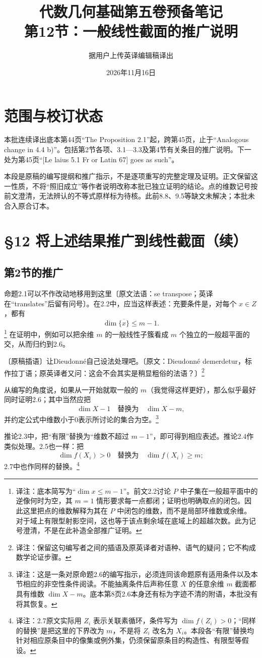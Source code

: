 \documentclass[openany,fontset=fandol]{ctexbook}
\title{代数几何基础第五卷预备笔记\\第12节：一般线性截面的推广说明}
\author{据用户上传英译编辑稿译出}
\date{2026年11月16日}
\newcommand{\note}[1]{\footnote{译注：#1}}
\begin{document}
\maketitle
\chapter*{范围与校订状态}
本批连续译出底本第44页“The Proposition 2.1”起，跨第45页，止于“Analogous change in 4.4 b)”。包括第2节各项、3.1—3.3及第4节有关条目的推广说明。下一处为第45页“[Le laius 5.1 Fr or Latin 67] goes as such”。

本段是原稿的编写提纲和推广指示，不是逐项重写的完整定理及证明。正文保留这一性质，不将“照旧成立”等作者说明改称本批已独立证明的结论。点的维数记号按前文澄清，无法辨认的不等式原样标为待核。此前8.8、9.5等缺文未解决；本批未合入原合订本。
\chapter*{\S12 将上述结果推广到线性截面（续）}
\section*{第2节的推广}
命题2.1可以不作改动地移用到这里〔原文法语：se transpose；英译在“translates”后留有问号〕。在2.2中，应当这样表述：充要条件是，对每个 $x\in Z$，都有
\[
\dim\overline{\{x\}}\leq m-1.
\]
\note{底本简写为“$\dim x\leq m-1$”。前文2.2讨论 $P$ 中子集在一般超平面中的逆像何时为空，其 $m=1$ 情形要求每一点都闭；证明也明确取点的闭包。因此这里把点的维数解释为其在 $P$ 中闭包的维数，而不是局部环维数或余维。对于域上有限型射影空间，这也等于该点剩余域在底域上的超越次数。此为记号澄清，不是在此补造全部推广证明。}
在证明中，例如可以把余维 $m$ 的一般线性子簇看成 $m$ 个独立的一般超平面的交，从而归约到2.6。

〔原稿插语〕让Dieudonné自己设法处理吧。〔原文：Dieudonné demerdetur，标作拉丁语；原英译者又问：这会不会其实是稍显粗俗的法语？〕\note{保留这句编写者之间的插语及原英译者对语种、语气的疑问；它不构成数学论证步骤。}

从编写的角度说，如果从一开始就取一般的 $m$（我觉得这样更好），那么似乎最好同时证明2.6；其中当然应把
\[
\dim X-1\quad\text{替换为}\quad\dim X-m,
\]
并约定公式中维数小于0表示所讨论的集合为空。\note{这是一条对原命题2.6的编写指示，必须连同该命题原有适用条件以及本节相应的非空性条件阅读。不能抽离条件后声称任意 $X$ 的任意余维 $m$ 截面都具有维数 $\dim X-m$。底本第8页2.6本身还有标为字迹不清的附语，本批没有将其恢复。}

推论2.3中，把“有限”替换为“维数不超过 $m-1$”，即可得到相应表述。推论2.4作类似处理。2.5也一样：把
\[
\dim f(X_i)>0\quad\text{替换为}\quad\dim f(X_i)\geq m;
\]
2.7中也作同样的替换。\note{2.7原文实际用 $Z_i$ 表示关联素循环，条件写为 $\dim f(Z_i)>0$；“同样的替换”是把这里的下界改为 $m$，不是将 $Z_i$ 改名为 $X_i$。本段各“有限”替换均针对相应原条目中的像集或例外集，仍须保留原条目的构造性、有限型等假设。}
\end{document}
